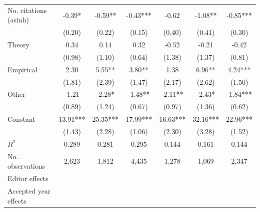 \begin{table}
\begin{threeparttable}
\begin{tabular}{p{3.78cm}S@{}S@{}S@{}S@{}S@{}S@{}}
            No. citations (asinh)         &       -0.39*  &       -0.59** &       -0.43***&       -0.62   &       -1.08** &       -0.85***\\
                                          &      (0.20)   &      (0.22)   &      (0.15)   &      (0.40)   &      (0.41)   &      (0.30)   \\
            Theory                        &        0.34   &        0.14   &        0.32   &       -0.52   &       -0.21   &       -0.42   \\
                                          &      (0.98)   &      (1.10)   &      (0.64)   &      (1.38)   &      (1.37)   &      (0.81)   \\
            Empirical                     &        2.30   &        5.55** &        3.80** &        1.38   &        6.96** &        4.24***\\
                                          &      (1.81)   &      (2.39)   &      (1.47)   &      (2.17)   &      (2.62)   &      (1.50)   \\
            Other                         &       -1.21   &       -2.28*  &       -1.48** &       -2.11** &       -2.43*  &       -1.84***\\
                                          &      (0.89)   &      (1.24)   &      (0.67)   &      (0.97)   &      (1.36)   &      (0.62)   \\
            Constant                      &       13.91***&       25.35***&       17.99***&       16.63***&       32.16***&       22.96***\\
                                          &      (1.43)   &      (2.28)   &      (1.06)   &      (2.30)   &      (3.28)   &      (1.52)   \\
            \midrule
            \(R^2\)                       &       0.289   &       0.281   &       0.295   &       0.144   &       0.161   &       0.144   \\
            No. observations              &       2,623   &       1,812   &       4,435   &       1,278   &       1,069   &       2,347   \\
            \midrule
            Editor effects        &           {}   &           {}   &           {}   &           {}   &           {}   &           {}   \\
            Accepted year effects         &           {}   &           {}   &               &           {}   &           {}   &               \\

\end{tabular}
\end{threeparttable}
\end{table}
